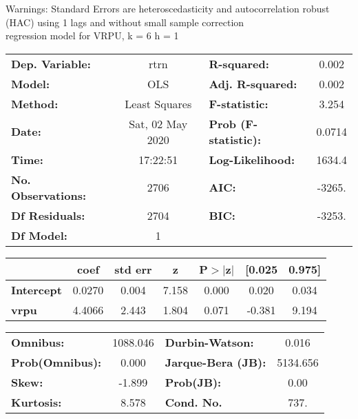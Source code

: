 Warnings: \newline
 [1] Standard Errors are heteroscedasticity and autocorrelation robust (HAC) using 1 lags and without small sample correction\\ 

regression model for VRPU, k = 6 h = 1\begin{center}
\begin{tabular}{lclc}
\toprule
\textbf{Dep. Variable:}    &       rtrn       & \textbf{  R-squared:         } &     0.002   \\
\textbf{Model:}            &       OLS        & \textbf{  Adj. R-squared:    } &     0.002   \\
\textbf{Method:}           &  Least Squares   & \textbf{  F-statistic:       } &     3.254   \\
\textbf{Date:}             & Sat, 02 May 2020 & \textbf{  Prob (F-statistic):} &   0.0714    \\
\textbf{Time:}             &     17:22:51     & \textbf{  Log-Likelihood:    } &    1634.4   \\
\textbf{No. Observations:} &        2706      & \textbf{  AIC:               } &    -3265.   \\
\textbf{Df Residuals:}     &        2704      & \textbf{  BIC:               } &    -3253.   \\
\textbf{Df Model:}         &           1      & \textbf{                     } &             \\
\bottomrule
\end{tabular}
\begin{tabular}{lcccccc}
                   & \textbf{coef} & \textbf{std err} & \textbf{z} & \textbf{P$> |$z$|$} & \textbf{[0.025} & \textbf{0.975]}  \\
\midrule
\textbf{Intercept} &       0.0270  &        0.004     &     7.158  &         0.000        &        0.020    &        0.034     \\
\textbf{vrpu}      &       4.4066  &        2.443     &     1.804  &         0.071        &       -0.381    &        9.194     \\
\bottomrule
\end{tabular}
\begin{tabular}{lclc}
\textbf{Omnibus:}       & 1088.046 & \textbf{  Durbin-Watson:     } &    0.016  \\
\textbf{Prob(Omnibus):} &   0.000  & \textbf{  Jarque-Bera (JB):  } & 5134.656  \\
\textbf{Skew:}          &  -1.899  & \textbf{  Prob(JB):          } &     0.00  \\
\textbf{Kurtosis:}      &   8.578  & \textbf{  Cond. No.          } &     737.  \\
\bottomrule
\end{tabular}
\end{center}

